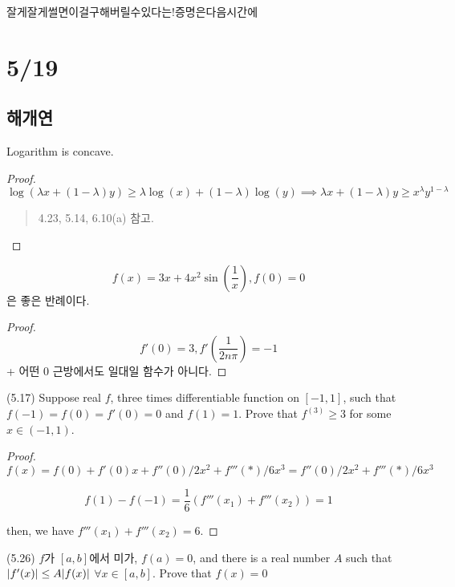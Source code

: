 \documentclass{article}
\begin{document}
잘게잘게썰면이걸구해버릴수있다는!증명은다음시간에

\section*{5/19}

\subsection*{해개연}

\begin{proposition}
    Logarithm is concave.
\end{proposition}

\begin{proof}
    \[
    \log(\lambda x + (1-\lambda) y) \geq \lambda \log (x) + (1-\lambda) \log(y) \implies \lambda x + (1-\lambda) y \geq x^\lambda y^{1-\lambda}
    \]
    \begin{quote}
        4.23, 5.14, 6.10(a) 참고.
    \end{quote}
\end{proof}

\begin{proposition}
    \[
    f(x)=3x+4x^2\sin \left(\frac{1}{x} \right), f(0)=0
    \]은 좋은 반례이다.
\end{proposition}

\begin{proof}
    \[
    f'(0)=3, f'(\frac{1}{2n\pi})=-1
    \] + 어떤 0 근방에서도 일대일 함수가 아니다.
\end{proof}

\begin{proposition}
    (5.17) Suppose real $f$, three times differentiable function on $[-1,1]$, such that $f(-1)=f(0)=f'(0)=0$ and $f(1)=1$.
    Prove that $f^{(3)}\geq 3$ for some $x \in (-1,1)$.
\end{proposition}

\begin{proof}
    \[
    f(x)=f(0)+f'(0)x+{f''(0)/2} x^2+ {f'''(*)/6} x^3={f''(0)/2} x^2+ {f'''(*)/6} x^3
    \]

    \[f(1)-f(-1)=\frac{1}{6}(f'''(x_1)+f'''(x_2))=1\]

    then, we have $f'''(x_1)+f'''(x_2)=6$.
\end{proof}

\begin{proposition}
    (5.26) $f$가 $[a,b]$에서 미가, $f(a) = 0$, and there is a real number $A$ such that $\lvert f'(x)\rvert \leq A \lvert f(x)\rvert$ $\forall x \in [a,b]$. Prove that $f(x)=0$ 
\end{proposition}
\end{document}
